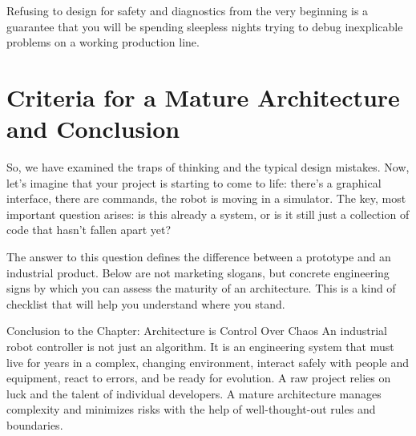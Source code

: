 Refusing to design for safety and diagnostics from the very beginning is a guarantee that you will be spending sleepless nights trying to debug inexplicable problems on a working production line.

\section{Criteria for a Mature Architecture and Conclusion}

So, we have examined the traps of thinking and the typical design mistakes. Now, let's imagine that your project is starting to come to life: there's a graphical interface, there are commands, the robot is moving in a simulator. The key, most important question arises: is this already a system, or is it still just a collection of code that hasn't fallen apart yet?

The answer to this question defines the difference between a prototype and an industrial product. Below are not marketing slogans, but concrete engineering signs by which you can assess the maturity of an architecture. This is a kind of checklist that will help you understand where you stand.

\begin{principlebox}{Conclusion to the Chapter: Architecture is Control Over Chaos}
An industrial robot controller is not just an algorithm. It is an engineering system that must live for years in a complex, changing environment, interact safely with people and equipment, react to errors, and be ready for evolution. A raw project relies on luck and the talent of individual developers. A mature architecture manages complexity and minimizes risks with the help of well-thought-out rules and boundaries.
\end{principlebox}



